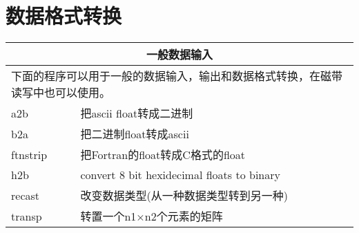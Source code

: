 \section{数据格式转换}
\begin{tabular}{ll}
	\multicolumn{2}{c}{一般数据输入}\\
	\toprule
	\multicolumn{2}{p{0.9\textwidth}}{下面的程序可以用于一般的数据输入，输出和数据格式转换，在磁带读写中也可以使用。}\\
	\midrule
	a2b & 把ascii float转成二进制\\
	b2a &把二进制float转成ascii\\	
	ftnstrip & 把Fortran的float转成C格式的float\\	
	h2b & convert 8 bit hexidecimal floats to binary\\	
	recast & 改变数据类型(从一种数据类型转到另一种)\\	
	transp & 转置一个n1×n2个元素的矩阵\\
	\bottomrule
\end{tabular} 

